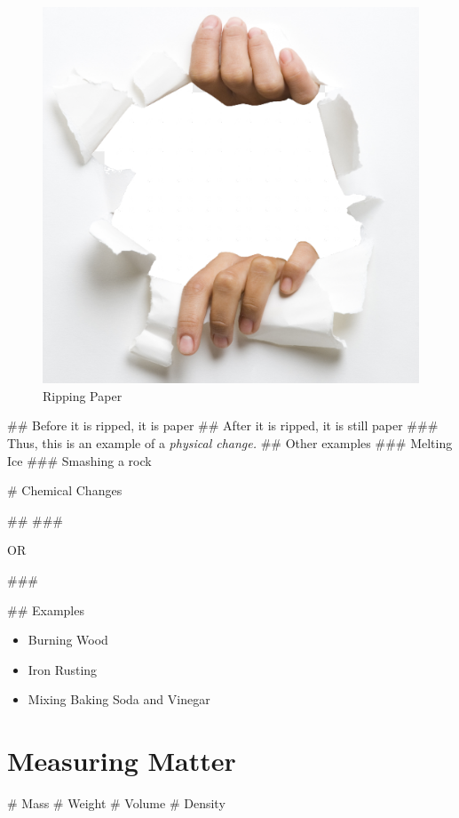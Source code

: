 \documentclass[../../Main/main.tex]{subfiles}
\begin{document}
\begin{easylist}
	\begin{figure}[h] %
		\centering %
		\includegraphics[scale=0.25]{./Resources/Images/rippingPaper.png}
		\caption{Ripping Paper} %
		\label{fig:example_image} %
	\end{figure}
	## Before it is ripped, it is paper
	## After it is ripped, it is still paper
	### Thus, this is an example of a \emph{physical change.}
	## Other examples
	### Melting Ice
	### Smashing a rock

	\newpage

	# Chemical Changes


	## 
	### 

	OR

	### 

	## Examples
	\begin{itemize}
		\item Burning Wood
		\item Iron Rusting
		\item Mixing Baking Soda and Vinegar
	\end{itemize}

	\section{Measuring Matter}
	# Mass
	# Weight
	# Volume
	# Density
\end{easylist}
\end{document}

